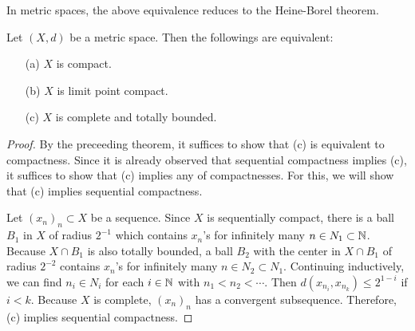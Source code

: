 In metric spaces, the above equivalence reduces to the Heine-Borel theorem.
\begin{thm}
    Let $(X, d)$ be a metric space.
    Then the followings are equivalent:
    \begin{enumerate}
        \item[(a)]
        {
            $X$ is compact.
        }
        \item[(b)]
        {
            $X$ is limit point compact.
        }
        \item[(c)]
        {
            $X$ is complete and totally bounded.
        }
    \end{enumerate}
\end{thm}
\begin{proof}
    By the preceeding theorem, it suffices to show that (c) is equivalent to compactness.
    Since it is already observed that sequential compactness implies (c), it suffices to show that (c) implies any of compactnesses.
    For this, we will show that (c) implies sequential compactness.

    Let $(x_n)_n\subset X$ be a sequence.
    Since $X$ is sequentially compact, there is a ball $B_1$ in $X$ of radius $2^{-1}$ which contains $x_n$'s for infinitely many $n\in N_1\subset{\mathbb{N}}$.
    Because $X\cap B_1$ is also totally bounded, a ball $B_2$ with the center in $X\cap B_1$ of radius $2^{-2}$ contains $x_n$'s for infinitely many $n\in N_2\subset N_1$.
    Continuing inductively, we can find $n_i\in N_i$ for each $i\in{\mathbb{N}}$ with $n_1<n_2<\cdots$.
    Then $d(x_{n_i}, x_{n_k})\leq 2^{1-i}$ if $i<k$.
    Because $X$ is complete, $(x_n)_n$ has a convergent subsequence.
    Therefore, (c) implies sequential compactness.
\end{proof}

